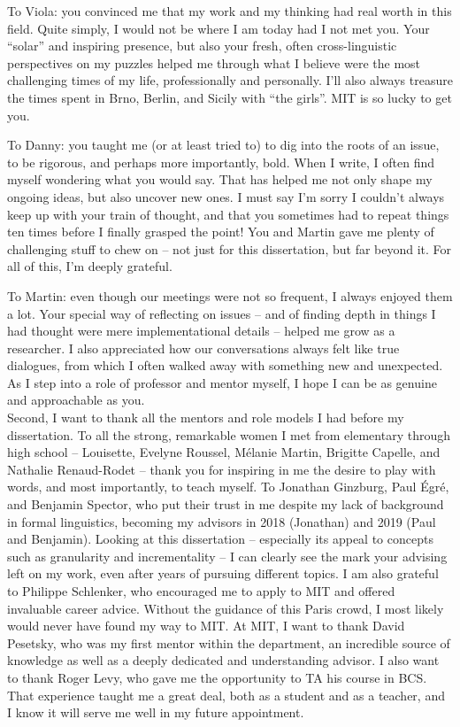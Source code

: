 To Viola: you convinced me that my work and my thinking had real worth in this field. Quite simply, I would not be where I am today had I not met you. Your ``solar'' and inspiring presence, but also your fresh, often cross-linguistic perspectives on my puzzles helped me through what I believe were the most challenging times of my life, professionally and personally. I'll also always treasure the times spent in Brno, Berlin, and Sicily with ``the girls''. MIT is so lucky to get you.


To Danny: you taught me (or at least tried to) to dig into the roots of an issue, to be rigorous, and perhaps more importantly, bold. When I write, I often find myself wondering what you would say. That has helped me not only shape my ongoing ideas, but also uncover new ones. I must say I'm sorry I couldn't always keep up with your train of thought, and that you sometimes had to repeat things ten times before I finally grasped the point! You and Martin gave me plenty of challenging stuff to chew on -- not just for this dissertation, but far beyond it. For all of this, I'm deeply grateful.

To Martin: even though our meetings were not so frequent, I always enjoyed them a lot. Your special way of reflecting on issues -- and of finding depth in things I had thought were mere implementational details -- helped me grow as a researcher. I also appreciated how our conversations always felt like true dialogues, from which I often walked away with something new and unexpected. As I step into a role of professor and mentor myself, I hope I can be as genuine and approachable as you.\\


Second, I want to thank all the mentors and role models I had before my dissertation. To all the strong, remarkable women I met from elementary through high school -- Louisette, Evelyne Roussel, Mélanie Martin, Brigitte Capelle, and Nathalie Renaud-Rodet -- thank you for inspiring in me the desire to play with words, and most importantly, to teach myself. To Jonathan Ginzburg, Paul Égré, and Benjamin Spector, who put their trust in me despite my lack of background in formal linguistics, becoming my advisors in 2018 (Jonathan) and 2019 (Paul and Benjamin). Looking at this dissertation -- especially its appeal to concepts such as granularity and incrementality -- I can clearly see the mark your advising left on my work, even after years of pursuing different topics. I am also grateful to Philippe Schlenker, who encouraged me to apply to MIT and offered invaluable career advice. Without the guidance of this Paris crowd, I most likely would never have found my way to MIT. At MIT, I want to thank David Pesetsky,  who was my first mentor within the department, an incredible source of knowledge as well as a deeply dedicated and understanding advisor. I also want to thank Roger Levy, who gave me the opportunity to TA his course in BCS. That experience taught me a great deal, both as a student and as a teacher, and I know it will serve me well in my future appointment.\\


